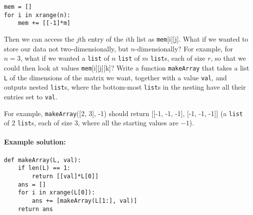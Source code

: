 \documentclass[11pt]{article}
\begin{document}
\begin{verbatim}
mem = []
for i in xrange(n):
    mem += [[-1]*m]
\end{verbatim}

Then we can access the $j$th entry of the $i$th list as
\texttt{mem}[i][j].  What if we wanted to store our data not
two-dimensionally, but $n$-dimensionally?  For example, for $n=3$,
what if we wanted a \texttt{list} of $n$ \texttt{list} of $m$
\texttt{list}s, each of size $r$, so that we could then look at
values \texttt{mem}[i][j][k]?  Write a function \texttt{makeArray}
that takes a list \texttt{L} of the dimensions of the matrix we want,
together
with a value \texttt{val}, and outputs nested \texttt{list}s, where
the bottom-most \texttt{list}s in the nesting have all their entries
set to \texttt{val}.

For example, \texttt{makeArray}([2, 3], -1) should return [[-1, -1,
-1], [-1, -1, -1]] (a \texttt{list} of $2$ \texttt{list}s, each of
size $3$, where all the starting values are $-1$).

\paragraph{Example solution:}
\begin{verbatim}
def makeArray(L, val):
    if len(L) == 1:
        return [[val]*L[0]]
    ans = []
    for i in xrange(L[0]):
        ans += [makeArray(L[1:], val)]
    return ans
\end{verbatim}



\end{document}
